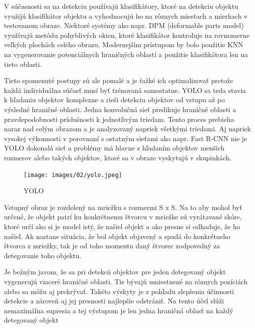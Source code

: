 V súčasnosti sa na detekciu používajú klasifikátory, ktoré na detekciu objektu využijú klasifikátor objektu a vyhodnocujú ho na rôznych miestach a mierkach v testovanom obraze. Niektoré systémy ako napr. DPM (deformable parts model) využívajú metódu pohyblivých okien, ktoré klasifikátor kontroluje na rovnomerne veľkých plochách celého obrazu.
Modernejším prístupom by bolo použitie KNN na vygenerovanie potenciálnych hraničných oblastí a použitie klasifikátora len na tieto oblasti.

Tieto spomenuté postupy sú ale pomalé a je ťažké ich optimalizovať pretože každá individuálna súčasť musí byť trénovaná samostatne. YOLO sa teda stavia k hľadaniu objektov komplexne a rieši detekciu objektov od vstupu až po výsledné hraničné oblasti. Jedna konvolučná sieť predikuje hraničné oblasti a pravdepodobnosti príslušnosti k jednotlivým triedam. Tento proces prebieha naraz nad celým obrazom a je analyzovaný napriek všetkými triedami. Aj napriek vysokej výkonnosti v porovnaní s ostatným sieťami ako napr. Fast R-CNN nie je YOLO dokonalá sieť a problémy má hlavne s hľadaním objektov menších rozmerov alebo takých objektov, ktoré sa v obraze vyskytujú v skupinkách.

\begin{figure}[ht]
    \centering
    \texttt{[image: images/02/yolo.jpeg]}
    \caption{YOLO}
    \label{img:ch2}
\end{figure}

Vstupný obraz je rozdelený na mriežku s rozmermi S x S. Na to aby mohol byť určené, že objekt patrí ku konkrétnemu štvorcu v mriežke sú vyrátavané skóre, ktoré určí ako si je model istý, že našiel objekt a ako presne si odhaduje, že ho našiel. Ak nastane situácia, že bol objekt objavený a spadá do konkrétneho štvorca z mriežky, tak je od toho momentu daný štvorec zodpovedný za detegovanie toho objektu.

Je bežným javom, že sa pri detekcii objektov pre jeden detegovaný objekt vygenerujú viaceré hraničné oblasti. Tie bývajú umiestnené na rôznych pozíciách alebo sa môžu aj prekrývať. Takéto výskyty je z pohľadu zlepšenia účinnosti detekcie a zároveň aj jej presnosti najlepšie odstrániť. Na tento účel slúži nemaximálna supresia a tej výstupom je len jedna hraničná oblasť na každý detegovaný objekt


